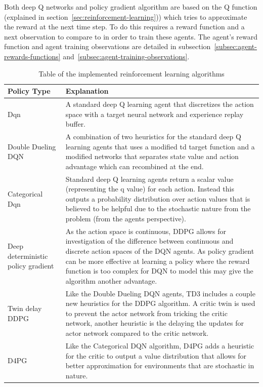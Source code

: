 Both deep Q networks and policy gradient algorithm are based on the Q function (explained in
section~\ref{sec:reinforcement-learning})) which tries to approximate the reward at the next time step. To do
this requires a reward function and a next observation to compare to in order to train these agents. The agent's
reward function and agent training observations are detailed in subsection~\ref{subsec:agent-rewards-functions}
and~\ref{subsec:agent-training-observations}.

\begin{table}
    \centering
    \begin{tabular}{|p{3cm}|p{10cm}|} \hline
        Policy Type & Explanation \\ \hline
        Dqn~\citep{mnih2015humanlevel} & A standard deep Q learning agent that discretizes the action space with a
            target neural network and experience replay buffer. \\ \hline
        Double Dueling DQN~\citep{doubledqn, duelingdqn} & A combination of two heuristics for the standard deep Q
            learning agents that uses a modified td target function and a modified networks that separates state value
            and action advantage which can recombined at the end. \\ \hline
        Categorical Dqn~\citep{distributional_dqn} & Standard deep Q learning agents return a scalar value
            (representing the q value) for each action. Instead this outputs a probability distribution over action
            values that is believed to be helpful due to the stochastic nature from the problem (from the agents
            perspective). \\ \hline
        Deep deterministic policy gradient~\citep{ddpg} & As the action space is continuous, DDPG allows for
            investigation of the difference between continuous and discrete action spaces of the DQN agents. As policy
            gradient can be more effective at learning a policy where the reward function is too complex for DQN to
            model this may give the algorithm another advantage. \\ \hline
        Twin delay DDPG~\citep{td3} & Like the Double Dueling DQN agents, TD3 includes a couple new heuristics for the
            DDPG algorithm. A critic twin is used to prevent the actor network from tricking the critic network, another
            heuristic is the delaying the updates for actor network compared to the critic network.\\ \hline
        D4PG~\citep{d4pg} & Like the Categorical DQN algorithm, D4PG adds a heuristic for the critic to output a
            value distribution that allows for better approximation for environments that are stochastic in nature.
            \\ \hline
    \end{tabular}
    \caption{Table of the implemented reinforcement learning algorithms}
    \label{tab:reinforcement_learning_algorithms}
\end{table}

